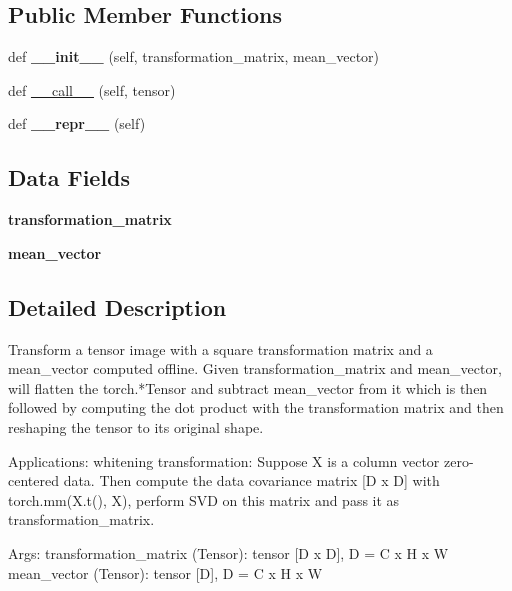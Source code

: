 \subsection*{Public Member Functions}
\begin{DoxyCompactItemize}
\item 
\mbox{\label{classtorchvision_1_1transforms_1_1transforms_1_1LinearTransformation_a31e03a2799b3e0b934ee2fb382e2622b}} 
def {\bfseries \+\_\+\+\_\+init\+\_\+\+\_\+} (self, transformation\+\_\+matrix, mean\+\_\+vector)
\item 
def \hyperlink{classtorchvision_1_1transforms_1_1transforms_1_1LinearTransformation_a9a29e7502fee078fcefed71fa7128657}{\+\_\+\+\_\+call\+\_\+\+\_\+} (self, tensor)
\item 
\mbox{\label{classtorchvision_1_1transforms_1_1transforms_1_1LinearTransformation_a8e0afb1c88966200a846983bcdd7126b}} 
def {\bfseries \+\_\+\+\_\+repr\+\_\+\+\_\+} (self)
\end{DoxyCompactItemize}
\subsection*{Data Fields}
\begin{DoxyCompactItemize}
\item 
\mbox{\label{classtorchvision_1_1transforms_1_1transforms_1_1LinearTransformation_a6186de2600c7afe87f6c87e2ce21f3da}} 
{\bfseries transformation\+\_\+matrix}
\item 
\mbox{\label{classtorchvision_1_1transforms_1_1transforms_1_1LinearTransformation_a8fee3cc6c34500e261a1bbb6567d6bb6}} 
{\bfseries mean\+\_\+vector}
\end{DoxyCompactItemize}


\subsection{Detailed Description}
\begin{DoxyVerb}Transform a tensor image with a square transformation matrix and a mean_vector computed
offline.
Given transformation_matrix and mean_vector, will flatten the torch.*Tensor and
subtract mean_vector from it which is then followed by computing the dot
product with the transformation matrix and then reshaping the tensor to its
original shape.

Applications:
    whitening transformation: Suppose X is a column vector zero-centered data.
    Then compute the data covariance matrix [D x D] with torch.mm(X.t(), X),
    perform SVD on this matrix and pass it as transformation_matrix.

Args:
    transformation_matrix (Tensor): tensor [D x D], D = C x H x W
    mean_vector (Tensor): tensor [D], D = C x H x W
\end{DoxyVerb}
 

